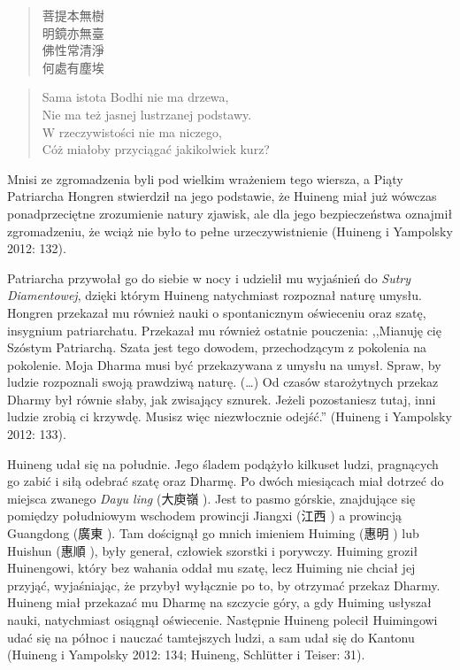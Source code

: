 \begin{minipage}[t]{0.4\textwidth}
\begin{verse}
菩提本無樹\\
明鏡亦無臺\\
佛性常清淨\\
何處有塵埃
\end{verse}
\end{minipage}
\begin{minipage}[t]{0.6\textwidth}
\itshape
\begin{verse}
Sama istota Bodhi nie ma drzewa,\\
Nie ma też jasnej lustrzanej podstawy.\\
W rzeczywistości nie ma niczego,\\
Cóż miałoby przyciągać jakikolwiek kurz?
\end{verse}
\end{minipage}
\label{HuinengVerse}
\vspace*{6pt}

Mnisi ze zgromadzenia byli pod wielkim wrażeniem tego wiersza, a Piąty Patriarcha Hongren stwierdził na jego podstawie, że Huineng miał już wówczas ponadprzeciętne zrozumienie natury zjawisk, ale dla jego bezpieczeństwa oznajmił zgromadzeniu, że wciąż nie było to pełne urzeczywistnienie
(Huineng i Yampolsky 2012: 132).

Patriarcha przywołał go do siebie w nocy i udzielił mu wyjaśnień do \textit{Sutry Diamentowej}, dzięki którym Huineng natychmiast rozpoznał naturę umysłu.
Hongren przekazał mu również nauki o spontanicznym oświeceniu oraz szatę, insygnium patriarchatu. Przekazał mu również ostatnie pouczenia: ,,Mianuję cię Szóstym Patriarchą. Szata jest tego dowodem, przechodzącym z pokolenia na pokolenie. Moja Dharma musi być przekazywana z umysłu na umysł. Spraw, by ludzie rozpoznali swoją prawdziwą naturę. (\ldots) Od czasów starożytnych przekaz Dharmy był równie słaby, jak zwisający sznurek. Jeżeli pozostaniesz tutaj, inni ludzie zrobią ci krzywdę. Musisz więc niezwłocznie odejść.'' (Huineng i Yampolsky 2012: 133).

Huineng udał się na południe. Jego śladem podążyło kilkuset ludzi, pragnących go zabić i siłą odebrać szatę oraz Dharmę. Po dwóch miesiącach miał dotrzeć do miejsca zwanego \textit{Dayu ling} (大庾嶺 ). Jest to pasmo górskie, znajdujące się pomiędzy południowym wschodem prowincji Jiangxi (江西 ) a prowincją Guangdong (廣東 ). Tam doścignął go mnich imieniem Huiming (惠明 ) lub Huishun (惠順 ), były generał, człowiek szorstki i porywczy. Huiming groził Huinengowi, który bez wahania oddał mu szatę, lecz Huiming nie chciał jej przyjąć, wyjaśniając, że przybył wyłącznie po to, by otrzymać przekaz Dharmy. Huineng miał przekazać mu Dharmę na szczycie góry, a gdy Huiming usłyszał nauki, natychmiast osiągnął oświecenie.
Następnie Huineng polecił Huimingowi udać się na północ i nauczać tamtejszych ludzi, a sam udał się do Kantonu (Huineng i Yampolsky 2012: 134; Huineng, Schlütter i Teiser: 31).

